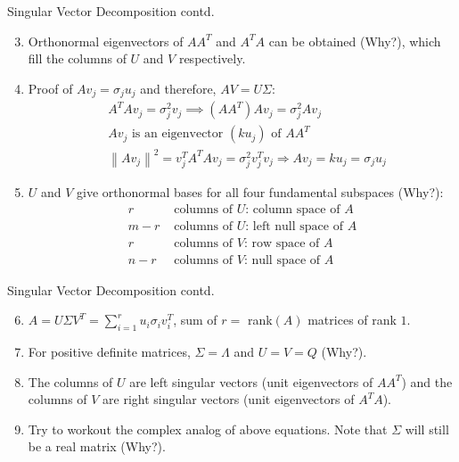 \documentclass{beamer}
\begin{document}
\begin{frame}{Singular Vector Decomposition contd.}
\begin{enumerate}
    \setcounter{enumi}{2}
    \item {
        Orthonormal eigenvectors of $AA^T$ and $A^TA$ can be obtained (Why?), which fill the columns of $U$ and $V$ respectively.
    }
    \item { 
        Proof of $Av_j=\sigma_j u_j $ and therefore, $AV = U\Sigma$:
        \begin{align*}
            &A^TAv_j = \sigma_j^2v_j \implies (AA^T)Av_j = \sigma_j^2Av_j\\
            &Av_j\text{ is an eigenvector $(ku_j)$ of } AA^T\\
            &\left\|Av_j\right\|^2 = v_j^TA^TAv_j = \sigma_j^2v_j^Tv_j \Rightarrow Av_j = ku_j = \sigma_ju_j
        \end{align*}
    }
    \item {
        $U$ and $V$ give orthonormal bases for all four fundamental subspaces (Why?):
        \begin{align*}
            r &\text{ columns of } U\text{: column space of }A\\
            m-r &\text{ columns of } U\text{: left null space of }A\\
            r &\text{ columns of } V\text{: row space of }A\\
            n-r &\text{ columns of } V\text{: null space of }A
        \end{align*}
    }
\end{enumerate}
\end{frame}

\begin{frame}{Singular Vector Decomposition contd.}
\begin{enumerate}
    \setcounter{enumi}{5}
    \item {
        $A = U\Sigma V^T = \sum_{i=1}^{r}u_i\sigma_iv_i^T$, sum of $r=$ rank$(A)$ matrices of rank $1$.
    }
    \item {
        For positive definite matrices, $\Sigma = \Lambda$ and $U=V=Q$ (Why?).
    }
    \item {
        The columns of $U$ are left singular vectors (unit eigenvectors of $AA^T$) and the columns of $V$ are right singular vectors (unit eigenvectors of $A^TA$).
    }
    \item {
        Try to workout the complex analog of above equations. Note that $\Sigma$ will still be a real matrix (Why?).
    }
\end{enumerate}
\end{frame}
\end{document}
